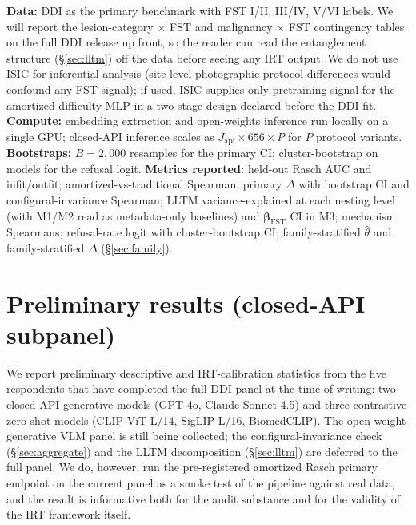 \documentclass{article}
\begin{document}
\textbf{Data:} DDI \citep{daneshjou2022disparities} as the primary benchmark with FST I/II, III/IV, V/VI labels. We will report the lesion-category $\times$ FST and malignancy $\times$ FST contingency tables on the full DDI release up front, so the reader can read the entanglement structure (\S\ref{sec:lltm}) off the data before seeing any IRT output. We do not use ISIC for inferential analysis (site-level photographic protocol differences would confound any FST signal); if used, ISIC supplies only pretraining signal for the amortized difficulty MLP in a two-stage design declared before the DDI fit.
\textbf{Compute:} embedding extraction and open-weights inference run locally on a single GPU; closed-API inference scales as $J_{\text{api}} \times 656 \times P$ for $P$ protocol variants.
\textbf{Bootstraps:} $B = 2{,}000$ resamples for the primary CI; cluster-bootstrap on models for the refusal logit.
\textbf{Metrics reported:} held-out Rasch AUC and infit/outfit; amortized-vs-traditional Spearman; primary $\Delta$ with bootstrap CI and configural-invariance Spearman; LLTM variance-explained at each nesting level (with M1/M2 read as metadata-only baselines) and $\boldsymbol{\beta}_{\text{FST}}$ CI in M3; mechanism Spearmans; refusal-rate logit with cluster-bootstrap CI; family-stratified $\hat\theta$ and family-stratified $\Delta$ (\S\ref{sec:family}).

\section{Preliminary results (closed-API subpanel)}
\label{sec:prelim_results}

We report preliminary descriptive and IRT-calibration statistics from the five respondents that have completed the full DDI panel at the time of writing: two closed-API generative models (GPT-4o, Claude Sonnet 4.5) and three contrastive zero-shot models (CLIP ViT-L/14, SigLIP-L/16, BiomedCLIP). The open-weight generative VLM panel is still being collected; the configural-invariance check (\S\ref{sec:aggregate}) and the LLTM decomposition (\S\ref{sec:lltm}) are deferred to the full panel. We do, however, run the pre-registered amortized Rasch primary endpoint on the current panel as a smoke test of the pipeline against real data, and the result is informative both for the audit substance and for the validity of the IRT framework itself.
\end{document}
